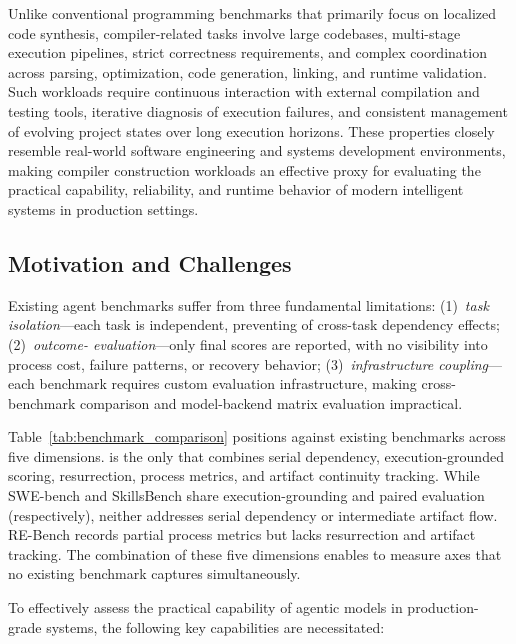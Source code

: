 Unlike conventional programming benchmarks that primarily focus on localized code synthesis, compiler-related tasks involve large codebases, multi-stage execution pipelines, strict correctness requirements, and complex coordination across parsing, optimization, code generation, linking, and runtime validation. Such workloads require continuous interaction with external compilation and testing tools, iterative diagnosis of execution failures, and consistent management of evolving project states over long execution horizons. These properties closely resemble real-world software engineering and systems development environments, making compiler construction workloads an effective proxy for evaluating the practical capability, reliability, and runtime behavior of modern intelligent systems in production settings.

\subsection{Motivation and Challenges}

Existing agent benchmarks suffer from three fundamental limitations: (1)~\emph{task isolation}---each task is independent, preventing  of cross-task dependency effects; (2)~\emph{outcome- evaluation}---only final scores are reported, with no visibility into process cost, failure patterns, or recovery behavior; (3)~\emph{infrastructure coupling}---each benchmark requires custom evaluation infrastructure, making cross-benchmark comparison and model-backend matrix evaluation impractical.

Table~\ref{tab:benchmark_comparison} positions \eva{} against existing benchmarks across five dimensions.
\eva{} is the only  that combines serial dependency, execution-grounded scoring, resurrection, process metrics, and artifact continuity tracking.
While SWE-bench and SkillsBench share execution-grounding and paired evaluation (respectively), neither addresses serial dependency or intermediate artifact flow.
RE-Bench records partial process metrics but lacks resurrection and artifact tracking.
The combination of these five dimensions enables \eva{} to measure  axes that no existing benchmark captures simultaneously.

To effectively assess the practical capability of agentic models in production-grade systems, the following key capabilities are necessitated:

